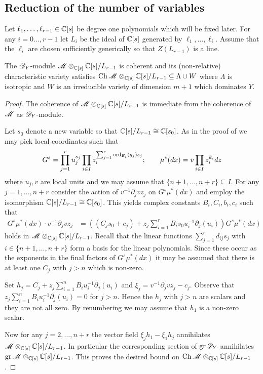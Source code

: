   \subsection{Reduction of the number of variables}
  Let $\ell_1,\ldots,\ell_{r-1}\in \mathbb{C}[s]$ be degree one polynomials which will be fixed later.
  For any $i=0\ldots,r-1$ let $L_i$ be the ideal of $\mathbb{C}[s]$ generated by $\ell_1,\ldots,\ell_i$.
  Assume that the $\ell_i$ are chosen sufficiently generically so that $Z(L_{r-1})$ is a line.
  \begin{proposition}\label{prop: CharVarEstimateW}
    The $\mathscr{D}_Y$-module $\mathscr{M}\otimes_{\mathbb{C}[s]}\mathbb{C}[s]/L_{r-1}$ is coherent and its (non-relative) characteristic variety satisfies $\operatorname{Ch}\mathscr{M}\otimes_{\mathbb{C}[s]}\mathbb{C}[s]/L_{r-1} \subseteq \Lambda \cup W $ where $\Lambda$ is isotropic and $W$ is an irreducible variety of dimension $m +1$ which dominates $Y$.
\end{proposition}
\begin{proof}
  The coherence of $\mathscr{M}\otimes_{\mathbb{C}[s]}\mathbb{C}[s]/L_{r-1}$ is immediate from the coherence of $\mathscr{M}$ as $\mathscr{D}_Y$-module.

  Let $s_0$ denote a new variable so that $\mathbb{C}[s]/L_{r-1}\cong \mathbb{C}[s_0]$. As in the proof of  we may pick local coordinates such that
  $$G^s = \prod_{j=1}^r u_j^{s_j} \prod_{i\in I} z_i^{\sum_{j=1}^r   \operatorname{ord}_{E_i}(g_j)s_j};\qquad \mu^*(dx) = v \prod_{i\in I} z_i^{k_i} dz$$
  where $u_j, v$ are local units and we may assume that $\{n+1,\ldots,n+r\}\subseteq I$.
  For any $j=1,\ldots,n+r$ consider the action of $v^{-1}\partial_j v z_j$ on $G^s \mu^*(dx)$ and employ the isomorphism $\mathbb{C}[s]/L_{r-1}\cong \mathbb{C}[s_0]$.
  This yields complex constants $B_i,C_i,b_i,c_i$ such that
  \begin{align*}
    G^s \mu^*(dx) \cdot v^{-1}\partial_j vz_j &=((C_j s_0 + c_j) + z_j\sum_{i=1}^{r} B_i s_0 u_i^{-1}\partial_j(u_i) ) G^s \mu^*(dx)
  \end{align*}
  holds in $\mathscr{M}\otimes_{\mathbb{C}[s]}\mathbb{C}[s]/L_{r-1}$.
  Recall that the linear functions $\sum_{j=1}^r d_{ij}s_j$ with $i \in \{n+1,\ldots,n+r\}$ form a basis for the linear polynomials.
  Since these occur as the exponents in the final factors of  $G^s\mu^*(dx)$ it may be assumed that there is at least one $C_{j}$ with $j>n$ which is non-zero.

  Set $h_j = C_j + z_j\sum_{i=1}^n B_iu_i^{-1}\partial_j(u_i)$ and $\xi_j= v^{-1}\partial_j vz_j - c_j$.
  Observe that $ z_j\sum_{i=1}^n B_iu_i^{-1}\partial_j(u_i) = 0$ for $j>n$.
  Hence the $h_{j}$ with $j>n$ are scalars and they are not all zero.
  By renumbering we may assume that $h_1$ is a non-zero scalar.

  Now for any $j=2,\ldots,n+r$ the vector field $\xi_j h_1 - \xi_1 h_j$ annihilates $\mathscr{M}\otimes_{\mathbb{C}[s]}\mathbb{C}[s]/L_{r-1}$.
  In particular the corresponding section of $\operatorname{gr} \mathscr{D}_Y$ annihilates $\operatorname{gr}\mathscr{M}\otimes_{\mathbb{C}[s]}\mathbb{C}[s]/L_{r-1}$.
  This proves the desired bound on $\operatorname{Ch} \mathscr{M}\otimes_{\mathbb{C}[s]}\mathbb{C}[s]/L_{r-1}$.
\end{proof}
